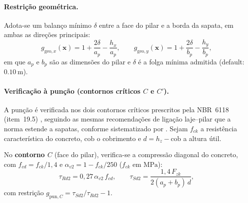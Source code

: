 \paragraph{Restrição geométrica.}
Adota-se um balanço mínimo $\delta$ entre a face do pilar e a borda da sapata, em ambas as direções principais:
\begin{equation}
    g_{\mathrm{geo},x}(\bm{x}) = 1 + \dfrac{2\delta}{a_p} - \dfrac{h_x}{a_p}, \qquad
    g_{\mathrm{geo},y}(\bm{x}) = 1 + \dfrac{2\delta}{b_p} - \dfrac{h_y}{b_p},
    \label{eq:g_geometria}
\end{equation}
em que $a_p$ e $b_p$ são as dimensões do pilar e $\delta$ é a folga mínima admitida (default: $\SI{0,10}{\meter}$).

\paragraph{Verificação à punção (contornos críticos $C$ e $C'$).}
A punção é verificada nos dois contornos críticos prescritos pela NBR~6118 (item~19.5) , seguindo as mesmas recomendações de ligação laje--pilar que a norma estende a sapatas, conforme sistematizado por . Sejam $f_{ck}$ a resistência característica do concreto, $\mathrm{cob}$ o cobrimento e $d = h_z - \mathrm{cob}$ a altura útil.

No \textbf{contorno $C$} (face do pilar), verifica-se a compressão diagonal do concreto, com $f_{cd} = f_{ck}/1{,}4$ e $\alpha_{v2} = 1 - f_{ck}/250$ ($f_{ck}$ em $\si{\mega\pascal}$):
\begin{equation}
    \tau_{Rd2} = 0{,}27 \, \alpha_{v2} \, f_{cd}, \qquad
    \tau_{Sd2} = \dfrac{1{,}4 \, F_{zk}}{2(a_p + b_p) \, d},
    \label{eq:puncao}
\end{equation}
com restrição $g_{\mathrm{pun},C} = \tau_{Sd2}/\tau_{Rd2} - 1$.

